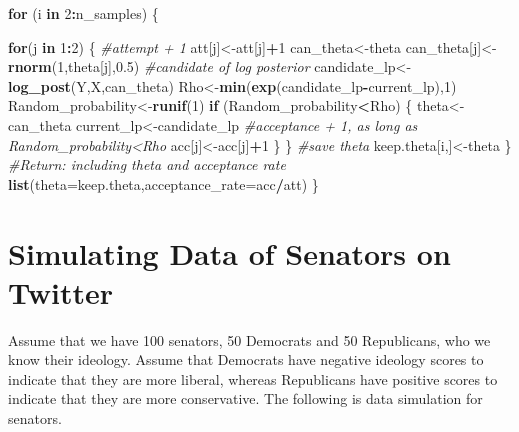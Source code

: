 \documentclass[]{book}
\newenvironment{Shaded}{\begin{snugshade}}{\end{snugshade}}
\newcommand{\KeywordTok}[1]{\textcolor[rgb]{0.13,0.29,0.53}{\textbf{#1}}}
\newcommand{\DataTypeTok}[1]{\textcolor[rgb]{0.13,0.29,0.53}{#1}}
\newcommand{\DecValTok}[1]{\textcolor[rgb]{0.00,0.00,0.81}{#1}}
\newcommand{\FloatTok}[1]{\textcolor[rgb]{0.00,0.00,0.81}{#1}}
\newcommand{\CommentTok}[1]{\textcolor[rgb]{0.56,0.35,0.01}{\textit{#1}}}
\newcommand{\ControlFlowTok}[1]{\textcolor[rgb]{0.13,0.29,0.53}{\textbf{#1}}}
\newcommand{\OperatorTok}[1]{\textcolor[rgb]{0.81,0.36,0.00}{\textbf{#1}}}
\newcommand{\NormalTok}[1]{#1}
\begin{document}
\begin{Shaded}
\begin{Highlighting}[]
  \ControlFlowTok{for}\NormalTok{ (i }\ControlFlowTok{in} \DecValTok{2}\OperatorTok{:}\NormalTok{n_samples)  }
\NormalTok{  \{}
    
    \ControlFlowTok{for}\NormalTok{(j }\ControlFlowTok{in} \DecValTok{1}\OperatorTok{:}\DecValTok{2}\NormalTok{)}
\NormalTok{    \{}
      \CommentTok{#attempt + 1}
\NormalTok{      att[j]<-att[j]}\OperatorTok{+}\DecValTok{1}
\NormalTok{      can_theta<-theta}
\NormalTok{      can_theta[j]<-}\KeywordTok{rnorm}\NormalTok{(}\DecValTok{1}\NormalTok{,theta[j],}\FloatTok{0.5}\NormalTok{)}
      \CommentTok{#candidate of log posterior}
\NormalTok{      candidate_lp<-}\KeywordTok{log_post}\NormalTok{(Y,X,can_theta)}
\NormalTok{      Rho<-}\KeywordTok{min}\NormalTok{(}\KeywordTok{exp}\NormalTok{(candidate_lp}\OperatorTok{-}\NormalTok{current_lp),}\DecValTok{1}\NormalTok{)}
\NormalTok{      Random_probability<-}\KeywordTok{runif}\NormalTok{(}\DecValTok{1}\NormalTok{)}
      \ControlFlowTok{if}\NormalTok{ (Random_probability}\OperatorTok{<}\NormalTok{Rho)}
\NormalTok{      \{}
\NormalTok{        theta<-can_theta}
\NormalTok{        current_lp<-candidate_lp}
        \CommentTok{#acceptance + 1, as long as Random_probability<Rho}
\NormalTok{        acc[j]<-acc[j]}\OperatorTok{+}\DecValTok{1}
\NormalTok{      \}}
\NormalTok{    \}}
    \CommentTok{#save theta}
\NormalTok{    keep.theta[i,]<-theta}
\NormalTok{  \}}
\CommentTok{#Return: including theta and acceptance rate}
  \KeywordTok{list}\NormalTok{(}\DataTypeTok{theta=}\NormalTok{keep.theta,}\DataTypeTok{acceptance_rate=}\NormalTok{acc}\OperatorTok{/}\NormalTok{att)}
\NormalTok{\}}
\end{Highlighting}
\end{Shaded}

\section{Simulating Data of Senators on
Twitter}\label{simulating-data-of-senators-on-twitter}

Assume that we have 100 senators, 50 Democrats and 50 Republicans, who
we know their ideology. Assume that Democrats have negative ideology
scores to indicate that they are more liberal, whereas Republicans have
positive scores to indicate that they are more conservative. The
following is data simulation for senators.
\end{document}
